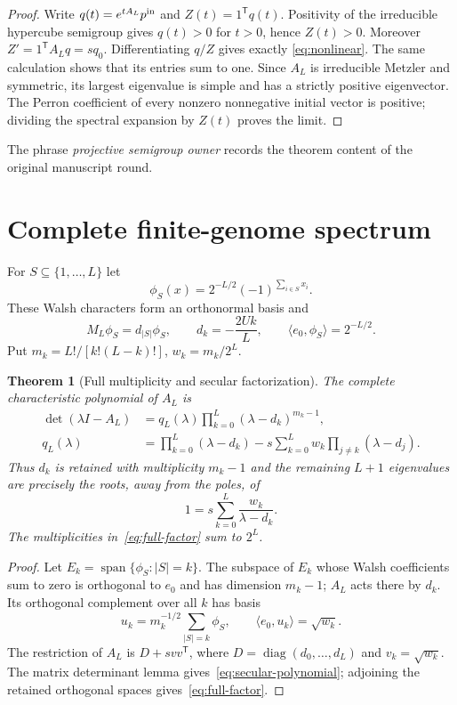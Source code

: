 \documentclass[10pt]{article}
\newtheorem{theorem}{Theorem}
\newcommand{\one}{\mathrm{1}}
\begin{document}
\begin{proof}
Write $q(t)=e^{tA_L}p^{\rm in}$ and $Z(t)=\one^{\mathsf T}q(t)$.  Positivity of
the irreducible hypercube semigroup gives $q(t)>0$ for $t>0$, hence $Z(t)>0$.
Moreover $Z'=\one^{\mathsf T}A_Lq=sq_0$.  Differentiating $q/Z$ gives exactly
\eqref{eq:nonlinear}.  The same calculation shows that its entries sum to
one.  Since $A_L$ is irreducible Metzler and symmetric, its largest eigenvalue
is simple and has a strictly positive eigenvector.  The Perron coefficient of
every nonzero nonnegative initial vector is positive; dividing the spectral
expansion by $Z(t)$ proves the limit.
\end{proof}

The phrase \emph{projective semigroup owner} records the theorem content of
the original manuscript round.

\section{Complete finite-genome spectrum}

For $S\subseteq\{1,\ldots,L\}$ let
\[
 \phi_S(x)=2^{-L/2}(-1)^{\sum_{i\in S}x_i}.
\]
These Walsh characters form an orthonormal basis and
\begin{equation}\label{eq:mutation-spectrum}
 M_L\phi_S=d_{|S|}\phi_S,\qquad
 d_k=-\frac{2Uk}{L},\qquad
 \langle e_0,\phi_S\rangle=2^{-L/2}.
\end{equation}
Put $m_k=L!/[k!(L-k)!]$, $w_k=m_k/2^L$.

\begin{theorem}[Full multiplicity and secular factorization]\label{thm:spectrum}
The complete characteristic polynomial of $A_L$ is
\begin{align}
 \det(\lambda I-A_L)
 &=q_L(\lambda)\prod_{k=0}^L
       (\lambda-d_k)^{m_k-1},\label{eq:full-factor}\\
 q_L(\lambda)
 &=\prod_{k=0}^L(\lambda-d_k)
   -s\sum_{k=0}^Lw_k\prod_{j\ne k}(\lambda-d_j).
   \label{eq:secular-polynomial}
\end{align}
Thus $d_k$ is retained with multiplicity $m_k-1$ and the remaining $L+1$
eigenvalues are precisely the roots, away from the poles, of
\begin{equation}\label{eq:secular}
 1=s\sum_{k=0}^L\frac{w_k}{\lambda-d_k}.
\end{equation}
The multiplicities in~\eqref{eq:full-factor} sum to $2^L$.
\end{theorem}

\begin{proof}
Let $E_k=\operatorname{span}\{\phi_S:|S|=k\}$.  The subspace of $E_k$
whose Walsh coefficients sum to zero is orthogonal to $e_0$ and has dimension
$m_k-1$; $A_L$ acts there by $d_k$.  Its orthogonal complement over all $k$
has basis
\[
 u_k=m_k^{-1/2}\sum_{|S|=k}\phi_S,
 \qquad \langle e_0,u_k\rangle=\sqrt{w_k}.
\]
The restriction of $A_L$ is $D+svv^{\mathsf T}$, where
$D=\operatorname{diag}(d_0,\ldots,d_L)$ and $v_k=\sqrt{w_k}$.  The matrix
determinant lemma gives~\eqref{eq:secular-polynomial}; adjoining the retained
orthogonal spaces gives~\eqref{eq:full-factor}.
\end{proof}
\end{document}
